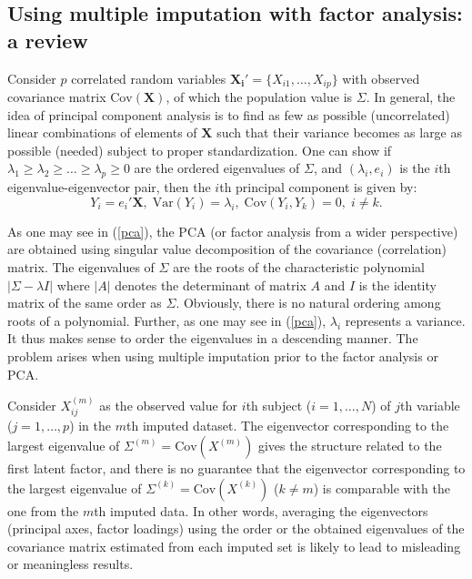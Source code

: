 \documentclass[11pt,a5paper,twoside]{book}
\begin{document}
\subsection{Using multiple imputation with factor analysis: a review}
\label{sec_review}
Consider $p$ correlated random variables $\mathbf{X_i'}=\{X_{i1},\ldots,X_{ip}\}$ with observed covariance matrix $\mathrm{Cov(\mathbf{X})}$, of which the population value is $\Sigma$. In general, the idea of principal component analysis is to find as few as possible (uncorrelated) linear combinations of elements of $\mathbf{X}$ such that their variance becomes as large as possible (needed) subject to proper standardization. One can show \citep{johnson1992} if $\lambda_1\geq\lambda_2\geq\ldots\geq\lambda_p\geq0$ are the ordered eigenvalues of $\Sigma$, and $(\lambda_i,{e_i})$ is the $i$th eigenvalue-eigenvector pair, then the $i$th principal component  is given by:
\begin{equation}
\label{pca}
Y_i= {e_i}' \mathbf{X},\; \mathrm{Var}(Y_i)=\lambda_i, \; \mathrm{Cov}(Y_i,Y_k)=0,\; i \neq k.
\end{equation}

As one may see in (\ref{pca}), the PCA (or factor analysis from a wider perspective) are obtained using singular value decomposition of the covariance (correlation) matrix. The eigenvalues of $\Sigma$ are the roots of the characteristic polynomial $|\Sigma-\lambda I|$ where $|A|$ denotes the determinant of matrix $A$ and $I$ is the identity matrix of the same order as $\Sigma$. Obviously, there is no natural ordering among roots of a polynomial. Further, as one may see in (\ref{pca}), $\lambda_i$ represents a variance. It thus makes sense to order the eigenvalues in a descending manner. The problem arises when using multiple imputation prior to the factor analysis or PCA.

Consider $X_{ij}^{(m)}$ as the observed value for $i$th subject ($i=1,\ldots,N$) of 
$j$th variable ($j=1,\ldots,p$) in the $m$th imputed dataset. The eigenvector corresponding to the largest eigenvalue of $\Sigma^{(m)}=\mathrm{Cov}(X^{(m)})$ gives the structure related to the first latent factor, and  there is no guarantee that the eigenvector corresponding to the largest eigenvalue of $\Sigma^{(k)}=\mathrm{Cov}(X^{(k)})$ ($k\neq m$) is comparable with the one from the $m$th imputed data. In other words, averaging the eigenvectors (principal axes, factor loadings) using the order or the obtained eigenvalues of the covariance matrix estimated from each imputed set  is likely to lead to misleading or meaningless results. 
\end{document}
